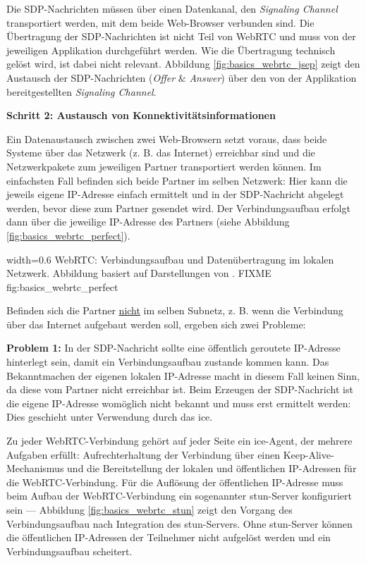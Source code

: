 Die SDP-Nachrichten müssen über einen
Datenkanal, den \emph{Signaling Channel} transportiert werden, mit dem
beide Web-Browser verbunden sind. Die Übertragung der SDP-Nachrichten
ist nicht Teil von WebRTC und muss von der jeweiligen Applikation
durchgeführt werden. Wie die Übertragung technisch gelöst wird, ist
dabei nicht relevant. Abbildung \ref{fig:basics_webrtc_jsep} zeigt den Austausch der
SDP-Nachrichten (\emph{Offer} \& \emph{Answer}) über den von der Applikation bereitgestellten
\emph{Signaling Channel}.

\textbf{Schritt 2: Austausch von Konnektivitätsinformationen}

Ein Datenaustausch zwischen zwei Web-Browsern setzt voraus, dass beide
Systeme über das Netzwerk (z. B. das Internet) erreichbar sind und die
Netzwerkpakete zum jeweiligen Partner transportiert werden können. Im
einfachsten Fall befinden sich beide Partner im selben Netzwerk: Hier
kann die jeweils eigene IP-Adresse einfach ermittelt und in der
SDP-Nachricht abgelegt werden, bevor diese zum Partner gesendet wird.
Der Verbindungsaufbau erfolgt dann über die jeweilige IP-Adresse des
Partners (siehe Abbildung \ref{fig:basics_webrtc_perfect}).

   {width=0.6\textwidth}
   {WebRTC: Verbindungsaufbau und Datenübertragung im lokalen Netzwerk.
    Abbildung basiert auf Darstellungen von \cite{real-world-signalling}.}
   {FIXME}
   {fig:basics_webrtc_perfect}

Befinden sich die Partner \underline{nicht} im selben Subnetz, z. B. wenn die
Verbindung über das Internet aufgebaut werden soll, ergeben sich zwei
Probleme:

\textbf{Problem 1:}
In der SDP-Nachricht sollte eine öffentlich geroutete IP-Adresse
hinterlegt sein, damit ein Verbindungsaufbau zustande kommen kann. Das
Bekanntmachen der eigenen lokalen IP-Adresse macht in diesem Fall
keinen Sinn, da diese vom Partner nicht erreichbar ist. Beim Erzeugen
der SDP-Nachricht ist die eigene IP-Adresse womöglich nicht bekannt
und muss erst ermittelt werden: Dies geschieht unter Verwendung durch
das \gls{ice}.

Zu jeder WebRTC-Verbindung gehört auf jeder Seite ein \gls{ice}-Agent,
der mehrere Aufgaben erfüllt: Aufrechterhaltung der Verbindung über
einen Keep-Alive-Mechanismus und die Bereitstellung der lokalen und
öffentlichen IP-Adressen für die WebRTC-Verbindung. Für die Auflösung
der öffentlichen IP-Adresse muss beim Aufbau der WebRTC-Verbindung ein
sogenannter \acrshort{stun}-Server konfiguriert sein --- Abbildung \ref{fig:basics_webrtc_stun}
zeigt den Vorgang des Verbindungsaufbau nach Integration des \acrshort{stun}-Servers.
Ohne \acrshort{stun}-Server können die öffentlichen IP-Adressen der Teilnehmer nicht
aufgelöst werden und ein Verbindungsaufbau scheitert.

